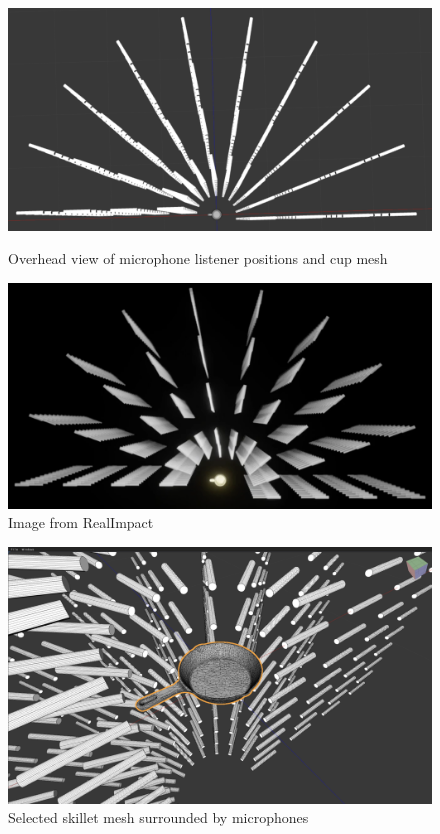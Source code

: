 \documentclass[12pt]{article}
\begin{document}
\begin{figure}[H]
    \centering
    \begin{minipage}[t]{0.45\linewidth}
        \includegraphics[width=\linewidth]{overhead_mic_view.png}
        \caption{Overhead view of microphone listener positions and cup mesh}
        \label{fig:mic_overhead}
    \end{minipage}
    \begin{minipage}[t]{0.45\linewidth}
        \includegraphics[width=\linewidth]{overhead_mic_comparison.png}
        \caption{Image from RealImpact}
        \label{fig:mic_overhead_compare}
    \end{minipage}
\end{figure}


\begin{figure}[H]
    \centering
    \begin{minipage}[t]{0.65\linewidth}
        \includegraphics[width=\linewidth]{real_impact_skillet.png}
        \caption{Selected skillet mesh surrounded by microphones}
        \label{fig:skillet}
    \end{minipage}
\end{figure}
\end{document}
